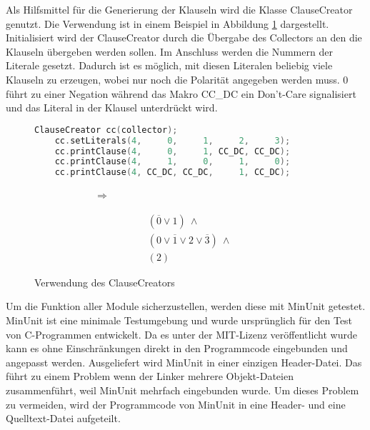 Als Hilfsmittel für die Generierung der Klauseln wird die Klasse ClauseCreator genutzt. Die Verwendung ist in einem Beispiel in Abbildung \ref{fig:clausecreator} dargestellt.
Initialisiert wird der ClauseCreator durch die Übergabe des Collectors an den die Klauseln übergeben werden sollen. Im Anschluss werden die Nummern der Literale gesetzt.
Dadurch ist es möglich, mit diesen Literalen beliebig viele Klauseln zu erzeugen, wobei nur noch die Polarität angegeben werden muss. $0$ führt zu einer Negation während
das Makro CC\_DC ein Don't-Care signalisiert und das Literal in der Klausel unterdrückt wird.
\begin{figure}[!h]
  \centering
  \begin{minipage}[c]{7.5cm}
    \begin{lstlisting}[language=c]
	ClauseCreator cc(collector);
	cc.setLiterals(4,     0,     1,     2,     3);
	cc.printClause(4,     0,     1, CC_DC, CC_DC);
	cc.printClause(4,     1,     0,     1,     0);
	cc.printClause(4, CC_DC, CC_DC,     1, CC_DC);
    \end{lstlisting}
  \end{minipage}
  \begin{minipage}[c]{2cm}
    ~~~~~~~~~~~~$ \Rightarrow $   
  \end{minipage}
  \begin{minipage}[c]{2cm}
    \begin{align*}
      & (\overline{0} \vee 1) ~ \wedge \\
      & (0 \vee \overline{1} \vee 2 \vee \overline{3}) ~ \wedge \\
      & (2) \nonumber
    \end{align*}
  \end{minipage}
  \caption{Verwendung des ClauseCreators}
  \label{fig:clausecreator}
\end{figure}

Um die Funktion aller Module sicherzustellen, werden diese mit MinUnit \cite{minunit} getestet. MinUnit ist eine minimale Testumgebung und
wurde ursprünglich für den Test von C-Programmen entwickelt. Da es unter der MIT-Lizenz veröffentlicht wurde kann es ohne Einschränkungen
direkt in den Programmcode eingebunden und angepasst werden. Ausgeliefert wird MinUnit in einer einzigen Header-Datei. Das führt zu einem
Problem wenn der Linker mehrere Objekt-Dateien zusammenführt, weil MinUnit mehrfach eingebunden wurde. Um dieses Problem zu vermeiden, wird
der Programmcode von MinUnit in eine Header- und eine Quelltext-Datei aufgeteilt.

